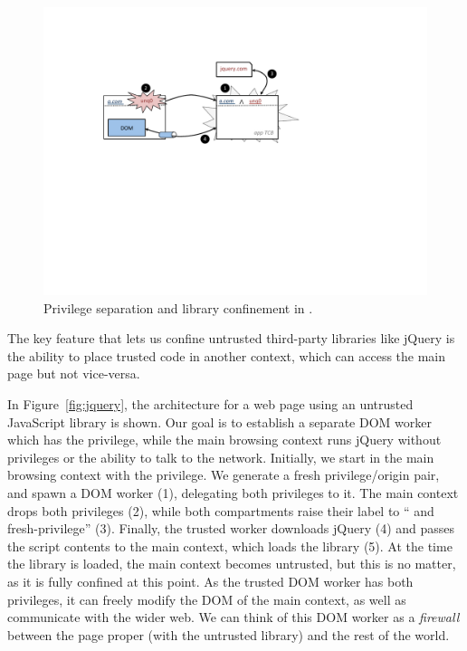 \begin{figure}
\centerline{\includegraphics[width=\columnwidth]{jquery}}
\caption{\label{fig:mashup} Privilege separation and library
confinement in \sys{}.}
\end{figure}

The key feature that lets us confine untrusted third-party libraries
like jQuery is the ability to place trusted code in another context,
which can access the main page but  not vice-versa.

In Figure~\ref{fig:jquery}, the architecture for a web page using an
untrusted JavaScript library is shown.  Our goal is to establish a
separate DOM worker which has the  privilege, while the
main browsing context runs jQuery without privileges or the ability to
talk to the network.  Initially, we start in the main browsing context
with the  privilege.  We generate a fresh privilege/origin
pair, and spawn a DOM worker (1), delegating both privileges to it.  The
main context drops both privileges (2), while both compartments raise
their label to `` and fresh-privilege'' (3).  Finally, the
trusted worker downloads jQuery (4) and passes the script contents to
the main context, which loads the library (5).  At the time the library
is loaded, the main context becomes untrusted, but this is no matter, as
it is fully confined at this point.  As the trusted DOM worker has both
privileges, it can freely modify the DOM of the main context, as well as
communicate with the wider web.  We can think of this DOM worker as a
\emph{firewall} between the page proper (with the untrusted library)
and the rest of the world.
